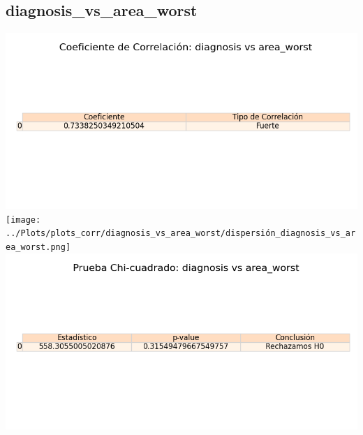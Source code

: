 \documentclass[a4paper, 12pt]{article}
\begin{document}
\subsection{diagnosis\_vs\_area\_worst}
    \includegraphics[width = \textwidth]{../Plots/plots_corr/diagnosis_vs_area_worst/coeficiente_correlacion_diagnosis_vs_area_worst.png}
    \texttt{[image: ../Plots/plots\_corr/diagnosis\_vs\_area\_worst/dispersión\_diagnosis\_vs\_area\_worst.png]}
    \includegraphics[width = \textwidth]{../Plots/plots_corr/diagnosis_vs_area_worst/chi_cuadrado_diagnosis_vs_area_worst.png}
\end{document}
